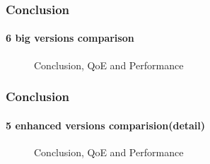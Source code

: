 \documentclass[14pt]{beamer}
\begin{document}
\begin{frame}
\frametitle{Conclusion}
\framesubtitle{6 big versions comparison}
\begin{figure}
	\caption{Conclusion, QoE and Performance}
\end{figure}
\end{frame}

\begin{frame}
\frametitle{Conclusion}
\framesubtitle{5 enhanced versions comparision(detail)}
\begin{figure}
	\caption{Conclusion, QoE and Performance}
\end{figure}
\end{frame}
\end{document}
